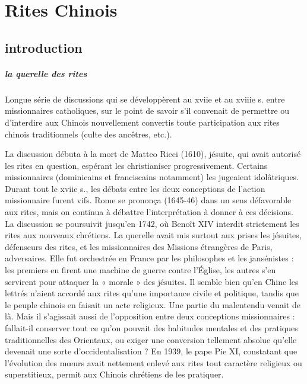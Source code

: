 \chapter{Rites Chinois}
\section{introduction}

\paragraph{la querelle des rites} Longue série de discussions qui se développèrent au xviie et au xviiie s. entre missionnaires catholiques, sur le point de savoir s'il convenait de permettre ou d'interdire aux Chinois nouvellement convertis toute participation aux rites chinois traditionnels (culte des ancêtres, etc.).

La discussion débuta à la mort de Matteo Ricci (1610), jésuite, qui avait autorisé les rites en question, espérant les christianiser progressivement. Certains missionnaires (dominicains et franciscains notamment) les jugeaient idolâtriques. Durant tout le xviie s., les débats entre les deux conceptions de l'action missionnaire furent vifs. Rome se prononça (1645-46) dans un sens défavorable aux rites, mais on continua à débattre l’interprétation à donner à ces décisions. La discussion se poursuivit jusqu’en 1742, où Benoît XIV interdit strictement les rites aux nouveaux chrétiens. La querelle avait mis surtout aux prises les jésuites, défenseurs des rites, et les missionnaires des Missions étrangères de Paris, adversaires. Elle fut orchestrée en France par les philosophes et les jansénistes : les premiers en firent une machine de guerre contre l’Église, les autres s’en servirent pour attaquer la « morale » des jésuites. Il semble bien qu’en Chine les lettrés n’aient accordé aux rites qu’une importance civile et politique, tandis que le peuple chinois en faisait un acte religieux. Une partie du malentendu venait de là. Mais il s’agissait aussi de l’opposition entre deux conceptions missionnaires : fallait-il conserver tout ce qu’on pouvait des habitudes mentales et des pratiques traditionnelles des Orientaux, ou exiger une conversion tellement absolue qu’elle devenait une sorte d’occidentalisation ? En 1939, le pape Pie XI, constatant que l’évolution des mœurs avait nettement enlevé aux rites tout caractère religieux ou superstitieux, permit aux Chinois chrétiens de les pratiquer.


